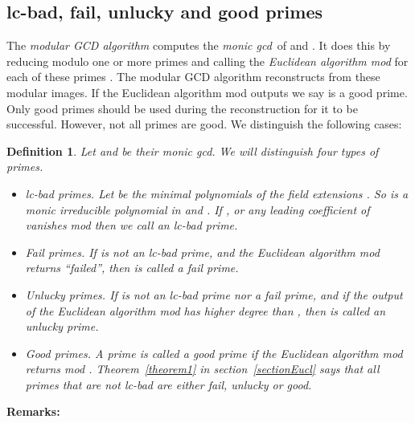 \documentclass[10pt]{article}
\newtheorem{definition}{Definition}
\newcommand{\bad}{lc-bad }
\begin{document}
\subsection{lc-bad, fail, unlucky and good primes}
The {\em modular GCD algorithm} computes the {\em monic gcd}\ 
 of  and .
It does this by reducing  modulo one or more primes
and calling the {\em Euclidean algorithm mod } for each of these primes .
The modular GCD algorithm reconstructs  from these modular images.
If the Euclidean algorithm mod  outputs  we say  is a good prime.
Only good primes should be used during the reconstruction for it to
be successful.
However, not all primes are good. We distinguish the following cases:
\begin{definition}
\label{definitionbad}
Let  and  be their monic gcd.
We will distinguish four types of primes.
\begin{itemize}
\item {\em \bad primes}.
Let  be the minimal polynomials of the 
field extensions .
So  is a monic irreducible polynomial in 
 and .
If ,  or
any leading coefficient of 
vanishes mod  then we call  an {\em \bad prime}.

\item {\em Fail primes}.
If  is not an \bad prime, and the Euclidean algorithm
mod  returns ``failed'', then  is called a {\em fail prime}.

\item {\em Unlucky primes}.
If  is not an \bad prime nor a fail prime, and if the
output of the Euclidean algorithm mod  has higher degree than ,
then  is called an {\em unlucky prime}.

\item {\em Good primes}.
A prime  is called a {\em good prime} if the Euclidean algorithm mod 
returns  mod .
Theorem~\ref{theorem1} in section~\ref{sectionEucl} says that all primes
that are not \bad are either fail, unlucky or good.
\end{itemize}
\end{definition}
{\bf Remarks:}
\end{document}
